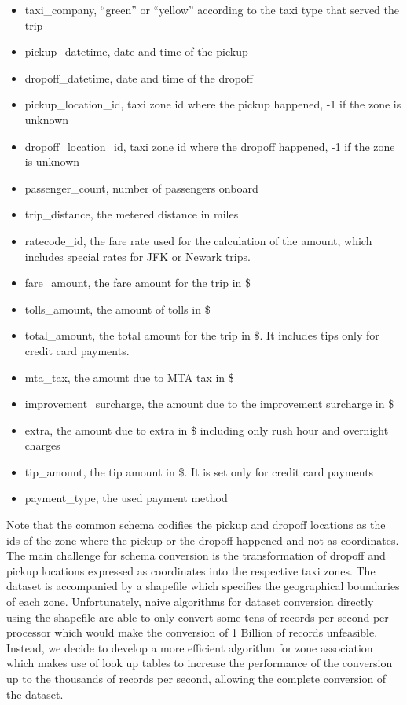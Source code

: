 \documentclass{acm_proc_article-sp-sigmod09}
\begin{document}
\begin{itemize}
	\item taxi\_company, ``green'' or ``yellow'' according to the taxi type that served the trip
	\item pickup\_datetime, date and time of the pickup
	\item dropoff\_datetime, date and time of the dropoff
	\item pickup\_location\_id, taxi zone id where the pickup happened, -1 if the zone is unknown
	\item dropoff\_location\_id, taxi zone id where the dropoff happened, -1 if the zone is unknown
	\item passenger\_count, number of passengers onboard
	\item trip\_distance, the metered distance in miles
	\item ratecode\_id, the fare rate used for the calculation of the amount, which includes special rates for JFK or Newark trips.
	\item fare\_amount, the fare amount for the trip in \$
	\item tolls\_amount, the amount of tolls in \$
	\item total\_amount, the total amount for the trip in \$. It includes tips only for credit card payments.
	\item mta\_tax, the amount due to MTA tax in \$
	\item improvement\_surcharge, the amount due to the improvement surcharge in \$
	\item extra, the amount due to extra in \$ including only rush hour and overnight charges
	\item tip\_amount, the tip amount in \$. It is set only for credit card payments
	\item payment\_type, the used payment method
\end{itemize}

Note that the common schema codifies the pickup and dropoff locations as the ids of the zone where the pickup or the dropoff happened and not as coordinates. The main challenge for schema conversion is the transformation of dropoff and pickup locations expressed as coordinates into the respective taxi zones. The dataset is accompanied by a shapefile which specifies the geographical boundaries of each zone. Unfortunately, naive algorithms for dataset conversion directly using the shapefile are able to only convert some tens of records per second per processor which would make the conversion of 1 Billion of records unfeasible. Instead, we decide to develop a more efficient algorithm for zone association which makes use of look up tables to increase the performance of the conversion up to the thousands of records per second, allowing the complete conversion of the dataset.
\end{document}
